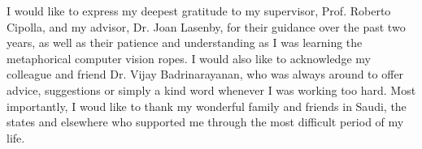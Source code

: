 
\begin{acknowledgements}      


I would like to express my deepest gratitude to my supervisor, Prof. Roberto Cipolla, and my advisor, Dr. Joan Lasenby, for their guidance over the past two years, as well as their patience and understanding as I was learning the metaphorical computer vision ropes.
I would also like to acknowledge my colleague and friend Dr. Vijay Badrinarayanan, who was always around to offer advice, suggestions or simply a kind word whenever I was working too hard.
Most importantly, I woud like to thank my wonderful family and friends in Saudi, the states and elsewhere who supported me through the most difficult period of my life.



\end{acknowledgements}
